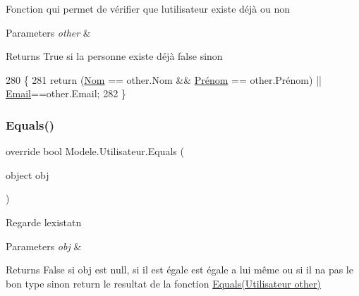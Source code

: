 Fonction qui permet de vérifier que l\textquotesingle{}utilisateur existe déjà ou non 


\begin{DoxyParams}{Parameters}
{\em other} & \\
\hline
\end{DoxyParams}
\begin{DoxyReturn}{Returns}
True si la personne existe déjà false sinon 
\end{DoxyReturn}

\begin{DoxyCode}
280         \{
281             \textcolor{keywordflow}{return} (\hyperlink{classModele_1_1Utilisateur_a2aa56cab9101d6c24445d3d6e1a7640d}{Nom} == other.Nom && \hyperlink{classModele_1_1Utilisateur_a8be63c78df8f6d3bbeb8f6ceb7197975}{Prénom} == other.Prénom) || 
      \hyperlink{classModele_1_1Utilisateur_a1250bfe957225a47f96f31e5d0c1d305}{Email}==other.Email;
282         \}
\end{DoxyCode}
\mbox{\label{classModele_1_1Utilisateur_a65df3c13ece48ba76a4a7e473d5e21ce}} 
\subsubsection{\texorpdfstring{Equals()}{Equals()}\hspace{0.1cm}{\footnotesize\ttfamily [2/2]}}
{\footnotesize\ttfamily override bool Modele.\+Utilisateur.\+Equals (\begin{DoxyParamCaption}\item[{object}]{obj }\end{DoxyParamCaption})\hspace{0.3cm}{\ttfamily [inline]}}



Regarde l\textquotesingle{}existatn 


\begin{DoxyParams}{Parameters}
{\em obj} & \\
\hline
\end{DoxyParams}
\begin{DoxyReturn}{Returns}
False si obj est null, si il est égale est égale a lui même ou si il n\textquotesingle{}a pas le bon type sinon return le resultat de la fonction \hyperlink{classModele_1_1Utilisateur_a9e1dffc7b478d59609cd06ad0bd58007}{Equals(\+Utilisateur other)} 
\end{DoxyReturn}


